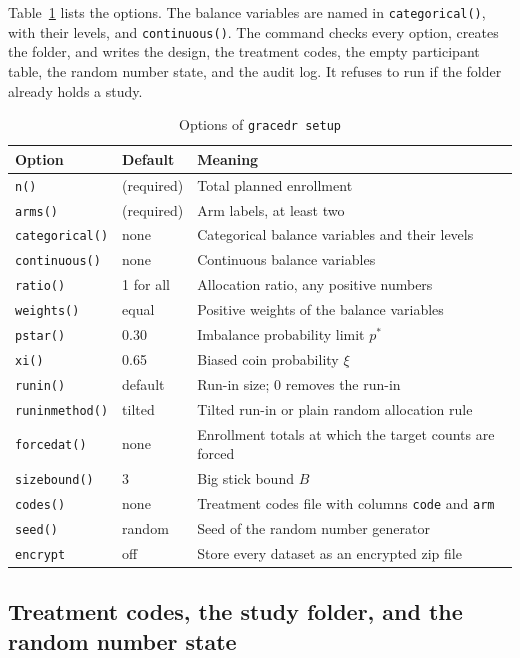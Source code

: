 \documentclass[bib]{statapress}
\begin{document}
\noindent Table~\ref{tab:options} lists the options. The balance variables are
named in \texttt{categorical()}, with their levels, and \texttt{continuous()}.
The command checks every option, creates the folder, and writes the design,
the treatment codes, the empty participant table, the random number state, and
the audit log. It refuses to run if the folder already holds a study.

\begin{table}[htbp]
\centering
\footnotesize
\caption{Options of \texttt{gracedr setup}}
\label{tab:options}
\begin{tabular}{lll}
\hline
Option & Default & Meaning \\
\hline
\texttt{n()} & (required) & Total planned enrollment \\
\texttt{arms()} & (required) & Arm labels, at least two \\
\texttt{categorical()} & none & Categorical balance variables and their
levels \\
\texttt{continuous()} & none & Continuous balance variables \\
\texttt{ratio()} & 1 for all & Allocation ratio, any positive numbers \\
\texttt{weights()} & equal & Positive weights of the balance variables \\
\texttt{pstar()} & 0.30 & Imbalance probability limit $p^\ast$ \\
\texttt{xi()} & 0.65 & Biased coin probability $\xi$ \\
\texttt{runin()} & default & Run-in size; 0 removes the run-in \\
\texttt{runinmethod()} & tilted & Tilted run-in or plain random allocation rule \\
\texttt{forcedat()} & none & Enrollment totals at which the target counts are
forced \\
\texttt{sizebound()} & 3 & Big stick bound $B$ \\
\texttt{codes()} & none & Treatment codes file with columns \texttt{code} and
\texttt{arm} \\
\texttt{seed()} & random & Seed of the random number generator \\
\texttt{encrypt} & off & Store every dataset as an encrypted zip file \\
\hline
\end{tabular}
\end{table}

\subsection{Treatment codes, the study folder, and the random number state}
\end{document}
